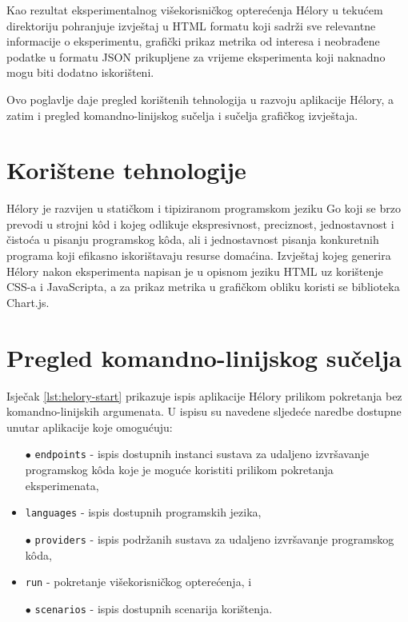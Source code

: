 \documentclass[times, utf8, diplomski]{fer}
\begin{document}
Kao rezultat eksperimentalnog višekorisničkog opterećenja Hélory u tekućem direktoriju pohranjuje izvještaj u HTML formatu koji sadrži sve relevantne informacije o eksperimentu, grafički prikaz metrika od interesa i neobrađene podatke u formatu JSON prikupljene za vrijeme eksperimenta koji naknadno mogu biti dodatno iskorišteni.

Ovo poglavlje daje pregled korištenih tehnologija u razvoju aplikacije Hélory, a zatim i pregled komandno-linijskog sučelja i sučelja grafičkog izvještaja.

\section{Korištene tehnologije}
Hélory je razvijen u statičkom i tipiziranom programskom jeziku Go \citep{donovan2015go} koji se brzo prevodi u strojni kôd i kojeg odlikuje ekspresivnost, preciznost, jednostavnost i čistoća u pisanju programskog kôda, ali i jednostavnost pisanja konkuretnih programa koji efikasno iskorištavaju resurse domaćina. Izvještaj kojeg generira Hélory nakon eksperimenta napisan je u opisnom jeziku HTML uz korištenje CSS-a i JavaScripta, a za prikaz metrika u grafičkom obliku koristi se biblioteka Chart.js.

\pagebreak

\section{Pregled komandno-linijskog sučelja}
Isječak \ref{lst:helory-start} prikazuje ispis aplikacije Hélory prilikom pokretanja bez komandno-linijskih argumenata. U ispisu su navedene sljedeće naredbe dostupne unutar aplikacije koje omogućuju:
\begin{itemize}
    \item[$\bullet$] \lstinline{endpoints} - ispis dostupnih instanci sustava za udaljeno izvršavanje programskog kôda koje je moguće koristiti prilikom pokretanja eksperimenata,
    \item[$\bullet$] \lstinline{languages} - ispis dostupnih programskih jezika,
    \item[$\bullet$] \lstinline{providers} - ispis podržanih sustava za udaljeno izvršavanje programskog kôda,
    \item[$\bullet$] \lstinline{run} - pokretanje višekorisničkog opterećenja, i
    \item[$\bullet$] \lstinline{scenarios} - ispis dostupnih scenarija korištenja.
\end{itemize}
\end{document}
